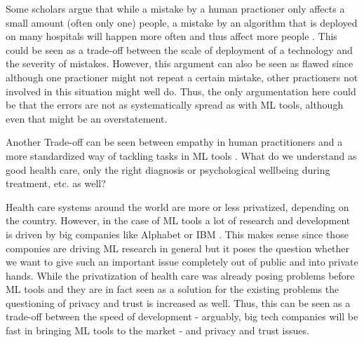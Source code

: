 Some scholars argue that while a mistake by a human practioner only affects a small amount (often only one) people, a mistake by an algorithm that is deployed on many hospitals will happen more often and thus affect more people \cite{Morley2020}. This could be seen as a trade-off between the scale of deployment of a technology and the severity of mistakes. However, this argument can also be seen as flawed since although one practioner might not repeat a certain mistake, other practioners not involved in this situation might well do. Thus, the only argumentation here could be that the errors are not as systematically spread as with ML tools, although even that might be an overstatement.


Another Trade-off can be seen between empathy in human practitioners and a more standardized way of tackling tasks in ML tools \cite{Morley2020}. What do we understand as good health care, only the right diagnosis or psychological wellbeing during treatment, etc. as well? 



Health care systems around the world are more or less privatized, depending on the country. However, in the case of ML tools a lot of research and development is driven by big companies like Alphabet or IBM \cite{Morley2020}. This makes sense since those componies are driving ML research in general but it poses the question whether we want to give such an important issue completely out of public and into private hands. While the privatization of health care was already posing problems before ML tools and they are in fact seen as a solution for the existing problems \cite{Morley2020, topol2019high} the questioning of privacy and trust is increased as well. Thus, this can be seen as a trade-off between the speed of development - arguably, big tech companies will be fast in bringing ML tools to the market - and privacy and trust issues.
